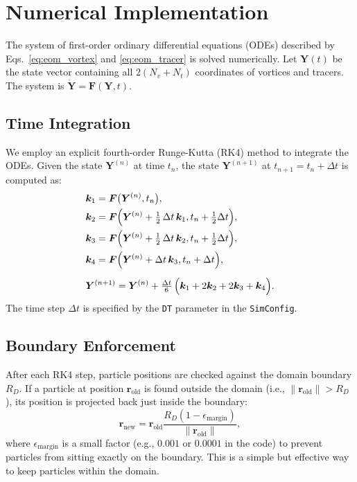 \documentclass[12pt,letterpaper]{article}
\newcommand{\domainradius}{R_D}
\begin{document}
\section{Numerical Implementation}
The system of first-order ordinary differential equations (ODEs) described by Eqs.~\eqref{eq:eom_vortex} and \eqref{eq:eom_tracer} is solved numerically. Let $\bm{Y}(t)$ be the state vector containing all $2(N_v+N_t)$ coordinates of vortices and tracers. The system is $\dot{\bm{Y}} = \bm{F}(\bm{Y}, t)$.

\subsection{Time Integration}
We employ an explicit fourth-order Runge-Kutta (RK4) method to integrate the ODEs. Given the state $\bm{Y}^{(n)}$ at time $t_n$, the state $\bm{Y}^{(n+1)}$ at $t_{n+1} = t_n + \Delta t$ is computed as:
\begin{align*}
 &\bm{k}_1 = \bm{F}\bigl(\bm{Y}^{(n)}, t_n\bigr),\\
 &\bm{k}_2 = \bm{F}\Bigl(\bm{Y}^{(n)}+\tfrac12\,\Delta t\,\bm{k}_1, t_n+\tfrac12\Delta t\Bigr),\\
 &\bm{k}_3 = \bm{F}\Bigl(\bm{Y}^{(n)}+\tfrac12\,\Delta t\,\bm{k}_2, t_n+\tfrac12\Delta t\Bigr),\\
 &\bm{k}_4 = \bm{F}\Bigl(\bm{Y}^{(n)}+\Delta t\,\bm{k}_3, t_n+\Delta t\Bigr),\\[5pt]
 &\bm{Y}^{(n+1)} = \bm{Y}^{(n)} + \tfrac{\Delta t}{6}\,\Bigl(\bm{k}_1+2\bm{k}_2+2\bm{k}_3+\bm{k}_4\Bigr).
\end{align*}
The time step $\Delta t$ is specified by the \texttt{DT} parameter in the \texttt{SimConfig}.

\subsection{Boundary Enforcement}
After each RK4 step, particle positions are checked against the domain boundary $\domainradius$. If a particle at position $\bm{r}_{\text{old}}$ is found outside the domain (i.e., $\|\bm{r}_{\text{old}}\| > \domainradius$), its position is projected back just inside the boundary:
\begin{equation}
    \bm{r}_{\text{new}} = \bm{r}_{\text{old}} \frac{\domainradius (1-\epsilon_{\text{margin}})}{\|\bm{r}_{\text{old}}\|},
\end{equation}
where $\epsilon_{\text{margin}}$ is a small factor (e.g., $0.001$ or $0.0001$ in the code) to prevent particles from sitting exactly on the boundary. This is a simple but effective way to keep particles within the domain.
\end{document}
